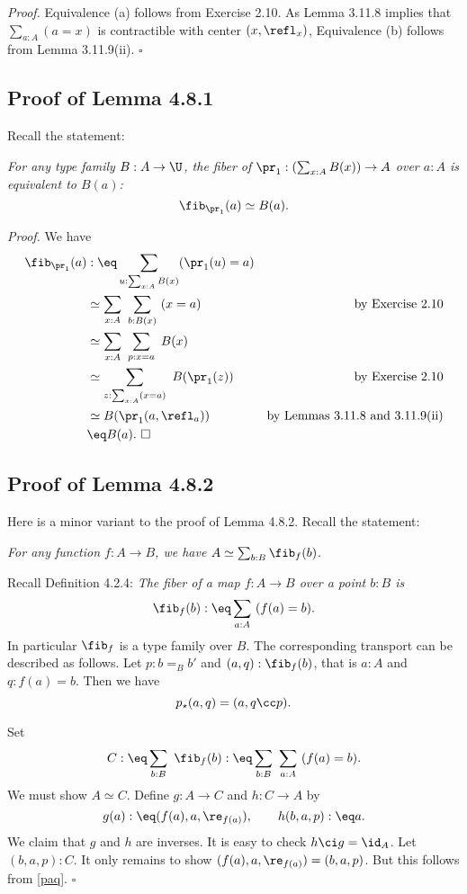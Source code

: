 \documentclass[12pt]{article}
\begin{document}
\nn\emph{Proof.} Equivalence (a) follows from Exercise 2.10. As Lemma 3.11.8 implies that $\sum_{a:A}(a=x)$ is contractible with center $(x,\refl_x)$, Equivalence (b) follows from Lemma 3.11.9(ii). $\square$


\subsection{Proof of Lemma 4.8.1}%

Recall the statement:

\emph{For any type family $B:A\to\U$, the fiber of $\pr_1:(\sum_{x:A}B(x))\to A$ over $a:A$ is equivalent to $B(a)$:}
$$
\fib_{\pr_1}(a)\simeq B(a).
$$

\nn\emph{Proof.} We have
\begin{align*}
\fib_{\pr_1}(a)&:\eq\sum_{u:\sum_{x:A}B(x)}(\pr_1(u)=a)\\
&\simeq\sum_{x:A}\ \sum_{b:B(x)}\ (x=a)&\text{by Exercise 2.10}\\
&\simeq\sum_{x:A}\ \sum_{p:x=a}\ B(x)\\
&\simeq\sum_{z:\sum_{x:A}(x=a)}\ B(\pr_1(z))&\text{by Exercise 2.10}\\
&\simeq B(\pr_1(a,\refl_a))&\text{by Lemmas 3.11.8 and 3.11.9(ii)}\\
&\eq B(a).\ \square
\end{align*}


\subsection{Proof of Lemma 4.8.2}\label{482}

Here is a minor variant to the proof of Lemma 4.8.2. Recall the statement:

\emph{For any function $f:A\to B$, we have} $A\simeq\sum_{b:B}\fib_f(b)$.

Recall Definition 4.2.4: \emph{The fiber of a map $f:A\to B$ over a point $b:B$ is} 
$$
\fib_f(b):\eq\sum_{a:A}\ (f(a)=b).
$$ 
In particular $\fib_f$ is a type family over $B$. The corresponding transport can be described as follows. Let $p:b=_Bb'$ and $(a,q):\fib_f(b)$, that is $a:A$ and $q:f(a)=b$. Then we have 
\begin{equation}\label{paq}
p_\star(a,q)=(a,q\cc p).
\end{equation}

Set 
$$
C:\eq\sum_{b:B}\ \fib_f(b):\eq\sum_{b:B}\ \sum_{a:A}\ (f(a)=b).
$$ 
We must show $A\simeq C$. Define $g:A\to C$ and $h:C\to A$ by 
$$
g(a):\eq(f(a),a,\re_{f(a)}),\qquad h(b,a,p):\eq a.
$$ 
We claim that $g$ and $h$ are inverses. It is easy to check $h\ci g=\id_A$. Let $(b,a,p):C$. It only remains to show $(f(a),a,\re_{f(a)})=(b,a,p)$. But this follows from \eqref{paq}. $\square$
\end{document}
